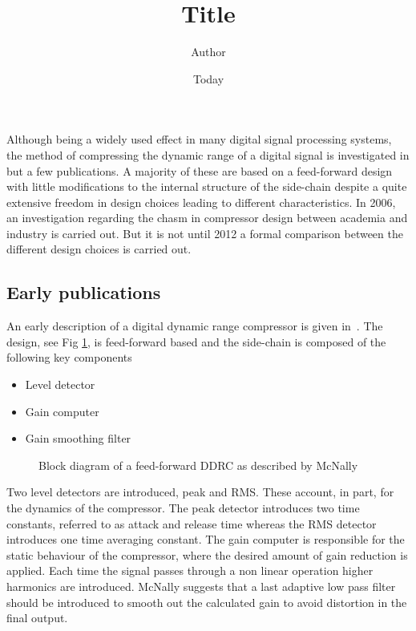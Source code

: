 \documentclass[]{article}
\begin{document}
\title{Title}
\author{Author}
\date{Today}
\maketitle
\section*{}
Although being a widely used effect in many digital signal processing systems, the method of compressing the dynamic range of a digital signal is investigated in but a few publications. A majority of these are based on a feed-forward design with little modifications to the internal structure of the side-chain despite a quite extensive freedom in design choices leading to different characteristics.  In 2006, an investigation regarding the chasm in compressor design between academia and industry is carried out. But it is not until 2012 a formal comparison between the different design choices is carried out.

\subsection*{Early publications}
An early description of a digital dynamic range compressor is given in~\cite{mcnally1984dynamic}. The design, see Fig \ref{fig:mcnaBlock}, is feed-forward based and the side-chain is composed of the following key components
\begin{itemize}
\item{Level detector}
\item{Gain computer}
\item{Gain smoothing filter}
\end{itemize}
\begin{figure}

\caption{Block diagram of a feed-forward DDRC as described by McNally}
\label{fig:mcnaBlock}
\end{figure}
Two level detectors are introduced, peak and RMS. These account, in part, for the dynamics of the compressor. The peak detector introduces two time constants, referred to as attack and release time whereas the RMS detector introduces one time averaging constant. The gain computer is responsible for the static behaviour of the compressor, where the desired amount of gain reduction is applied. Each time the signal passes through a non linear operation higher harmonics are introduced. McNally suggests that a last adaptive low pass filter should be introduced to smooth out the calculated gain to avoid distortion in the final output.
\end{document}
